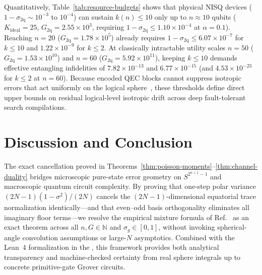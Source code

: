 Quantitatively, Table~\ref{tab:resource-budgets} shows that physical NISQ devices ($1 - \sigma_{2\mathrm{q}} \sim 10^{-3}$ to $10^{-4}$) can sustain $k(n) \le 10$ only up to $n \approx 10$ qubits ($K_{\mathrm{ideal}} = 25$, $G_{2\mathrm{q}} = 2.55 \times 10^3$, requiring $1 - \sigma_{2\mathrm{q}} \le 1.10 \times 10^{-4}$ at $\alpha = 0.1$). Reaching $n = 20$ ($G_{2\mathrm{q}} = 1.78 \times 10^5$) already requires $1 - \sigma_{2\mathrm{q}} \le 6.07 \times 10^{-7}$ for $k \le 10$ and $1.22 \times 10^{-9}$ for $k \le 2$. At classically intractable utility scales $n = 50$ ($G_{2\mathrm{q}} = 1.53 \times 10^{10}$) and $n = 60$ ($G_{2\mathrm{q}} = 5.92 \times 10^{11}$), keeping $k \le 10$ demands effective entangling infidelities of $7.82 \times 10^{-13}$ and $6.77 \times 10^{-15}$ (and $4.53 \times 10^{-23}$ for $k \le 2$ at $n = 60$). Because encoded QEC blocks cannot suppress isotropic errors that act uniformly on the logical sphere~\cite{Lacalle2021}, these thresholds define direct upper bounds on residual logical-level isotropic drift across deep fault-tolerant search compilations.

\section{Discussion and Conclusion}
\label{sec:discussion}

The exact cancellation proved in Theorems~\ref{thm:poisson-moments}--\ref{thm:channel-duality} bridges microscopic pure-state error geometry on $S^{2^{n+1}-1}$ and macroscopic quantum circuit complexity. By proving that one-step polar variance $(2N - 1)(1 - \sigma^2)/(2N)$ cancels the $(2N - 1)$-dimensional equatorial trace normalization identically---and that even--odd basis orthogonality eliminates all imaginary floor terms---we resolve the empirical mixture formula of Ref.~\cite{SahaRoyLacalle2026} as an exact theorem across all $n, G \in \mathbb{N}$ and $\sigma_g \in [0, 1]$, without invoking spherical-angle convolution assumptions or large-$N$ asymptotics. Combined with the Lean~4 formalization in the \suppRef, this framework provides both analytical transparency and machine-checked certainty from real sphere integrals up to concrete primitive-gate Grover circuits.

